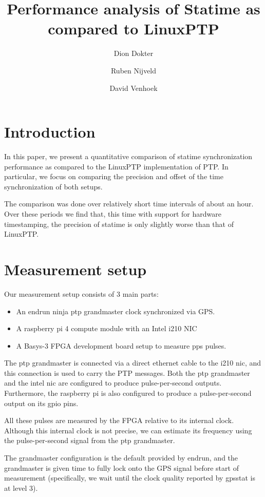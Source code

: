 \documentclass{article}
\title{Performance analysis of Statime as compared to LinuxPTP}
\author{Dion Dokter \and Ruben Nijveld \and David Venhoek}
\begin{document}
\maketitle

\section{Introduction}

In this paper, we present a quantitative comparison of statime synchronization performance as compared to the LinuxPTP implementation of PTP. In particular, we focus on comparing the precision and offset of the time synchronization of both setups.

The comparison was done over relatively short time intervals of about an hour. Over these periods we find that, this time with support for hardware timestamping, the precision of statime is only slightly worse than that of LinuxPTP.

\section{Measurement setup}

Our measurement setup consists of 3 main parts:
\begin{itemize}
    \item An endrun ninja ptp grandmaster clock synchronized via GPS.
    \item A raspberry pi 4 compute module with an Intel i210 NIC
    \item A Basys-3 FPGA development board setup to measure pps pulses.
\end{itemize}

The ptp grandmaster is connected via a direct ethernet cable to the i210 nic, and this connection is used to carry the PTP messages. Both the ptp grandmaster and the intel nic are configured to produce pulse-per-second outputs. Furthermore, the raspberry pi is also configured to produce a pulse-per-second output on its gpio pins.

All these pulses are measured by the FPGA relative to its internal clock. Although this internal clock is not precise, we can estimate its frequency using the pulse-per-second signal from the ptp grandmaster.

The grandmaster configuration is the default provided by endrun, and the grandmaster is given time to fully lock onto the GPS signal before start of measurement (specifically, we wait until the clock quality reported by gpsstat is at level 3).
\end{document}
